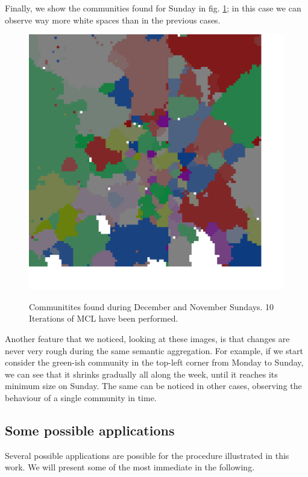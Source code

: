\documentclass[12pt,a4paper]{article}
\begin{document}
Finally, we show the communities found for Sunday in fig. \ref{fig:sunday}; in this case we can observe way more white spaces than in the previous cases.

\begin{figure}[H]
\includegraphics[width=\linewidth]{week/7Sun.png}
\label{fig:sunday}
\caption{Communitites found during December and November Sundays. 10 Iterations of MCL have been performed.}
\end{figure}

Another feature that we noticed, looking at these images, is that changes are never very rough during the same semantic aggregation.
For example, if we start consider the green-ish community in the top-left corner from Monday to Sunday, we can see that it shrinks gradually all along the week, until it reaches its minimum size on Sunday. The same can be noticed in other cases, observing the behaviour of a single community in time. 

\subsection{Some possible applications}
Several possible applications are possible for the procedure illustrated in this work. We will present some of the most immediate in the following.
\end{document}
